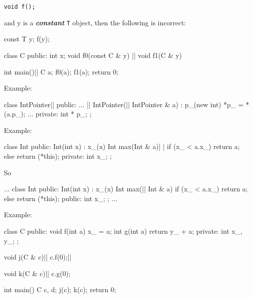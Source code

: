 \texttt{void f();}

and y is a \textbf{\textit{constant}} \texttt{T} object, then the following
is incorrect:

\begin{consolethree}[escapeinside=||]
const T y;
f(y);
\end{consolethree}

\begin{consolethree}[escapeinside=||]
class C {public: int x};
void f0(const C & y) {}||
void f1(C & y) {}

int main()||
{
    C a;
    f0(a); f1(a);
    return 0;
}
\end{consolethree}
Example:

\begin{consolethree}[escapeinside=||]
class IntPointer||
{
public:
    ...         ||
    IntPointer(|| IntPointer & a)
        : p_(new int)
    { *p_ = *(a.p_); }
    ...
private:
    int * p_;
};
\end{consolethree}

Example:

\begin{consolethree}[escapeinside=||]
class Int
{
public:
    Int(int x)
        : x_(x)
    {}
    Int max(Int & a)| |
    {
        if (x_ < a.x_)
            return a;
        else
            return (*this);
    }
private:
    int x_;
};
\end{consolethree}
So

\begin{consolethree}[escapeinside=||]
...
class Int
{
public:
    Int(int x)
        : x_(x)
    {}
    Int max(|| Int & a)
    {
        if (x_ < a.x_)
            return a;
        else
            return (*this);
    }
public:
    int x_;
};
...
\end{consolethree}

Example:

\begin{consolethree}[escapeinside=||]
class C
{
public:
    void f(int a)
    {
        x_ = a;
    }
    int g(int a)
    {
        return y_ + a;
    }
private:
    int x_, y_;
};

void j(C & c)||
{
    c.f(0);||
}

void k(C & c)||
{
    c.g(0);
}

int main()
{
    C c, d;
    j(c);
    k(c);
    return 0;
}
\end{consolethree}

